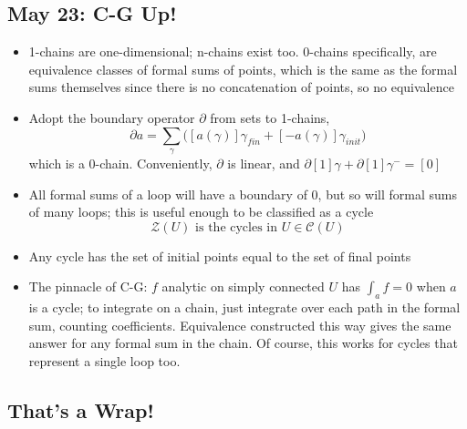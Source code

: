 \documentclass[10pt, oneside]{article}
\begin{document}
\subsection{May 23: C-G Up!}
\begin{itemize}
    \item 1-chains are one-dimensional; n-chains exist too. 0-chains specifically, are equivalence classes of formal sums of points, which is the same as the formal sums themselves since there is no concatenation of points, so no equivalence
    \item Adopt the boundary operator $\partial$ from sets to 1-chains,
            \[\partial a = \sum_\gamma \big([a(\gamma)] \gamma_{fin} + [-a(\gamma)] \gamma_{init}\big)\]
        which is a 0-chain. Conveniently, $\partial$ is linear, and $\partial [1]\gamma + \partial [1]\gamma^- = [0]$
    \item All formal sums of a loop will have a boundary of $0$, but so will formal sums of many loops; this is useful enough to be classified as a cycle
            \[\mathcal{Z}(U) \text{ is the cycles in } U \in \mathcal{C}(U)\]
    \item Any cycle has the set of initial points equal to the set of final points
    \item The pinnacle of C-G: $f$ analytic on simply connected $U$ has $\int_a f = 0$ when $a$ is a cycle; to integrate on a chain, just integrate over each path in the formal sum, counting coefficients. Equivalence constructed this way gives the same answer for any formal sum in the chain. Of course, this works for cycles that represent a single loop too.
\end{itemize}

\subsection{That's a Wrap!}
\end{document}
